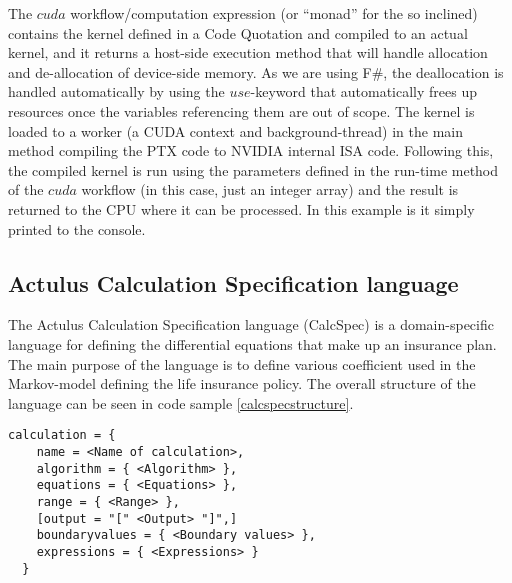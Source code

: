 The $cuda$ workflow/computation expression (or ``monad'' for the so inclined) contains the kernel defined in a Code Quotation and compiled to an actual kernel, and it returns a host-side execution method that will handle allocation and de-allocation of device-side memory. 
As we are using F\#, the deallocation is handled automatically by using the $use$-keyword that automatically frees up resources once the variables referencing them are out of scope. 
The kernel is loaded to a worker (a CUDA context and background-thread) in the main method compiling the PTX code to NVIDIA internal ISA code. %
Following this, the compiled kernel is run using the parameters defined in the run-time method of the $cuda$ workflow (in this case, just an integer array) and the result is returned to the CPU where it can be processed. 
In this example is it simply printed to the console. 

\subsection{Actulus Calculation Specification language}\label{subsec:background:calcspec}
The Actulus Calculation Specification language (CalcSpec) is a domain-specific language for defining the differential equations that make up an insurance plan.
The main purpose of the language is to define various coefficient used in the Markov-model defining the life insurance policy.
The overall structure of the language can be seen in code sample \ref{calcspecstructure}.

\begin{lstlisting}[caption=CalcSpec structure, label=calcspecstructure, language=calcspec]
calculation = {
    name = <Name of calculation>,
    algorithm = { <Algorithm> },
    equations = { <Equations> },
    range = { <Range> },
    [output = "[" <Output> "]",]
    boundaryvalues = { <Boundary values> },
    expressions = { <Expressions> }
  }
\end{lstlisting}

